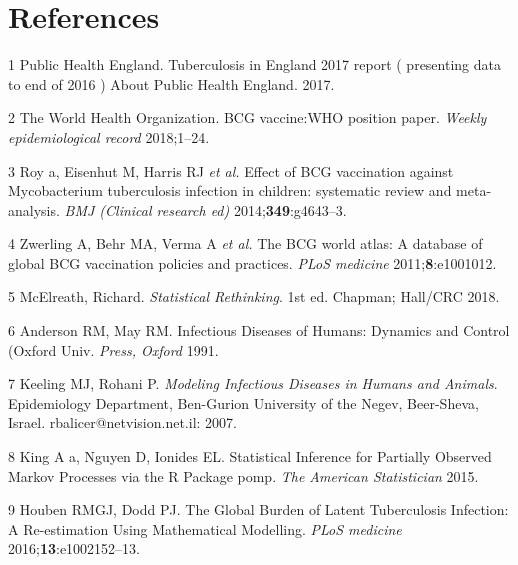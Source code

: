 \documentclass[11pt,twoside]{bristolthesis}
\begin{document}
  \backmatter
  
  \hypertarget{references}{%
  \chapter{References}\label{references}}
  
  \noindent
  
  \setlength{\parindent}{-0.20in}
  \setlength{\leftskip}{0.20in}
  \setlength{\parskip}{8pt}
  
  \hypertarget{refs}{}
  \leavevmode\hypertarget{ref-PHE2017}{}%
  1 Public Health England. Tuberculosis in England 2017 report ( presenting data to end of 2016 ) About Public Health England. 2017.
  
  \leavevmode\hypertarget{ref-TheWorldHealthOrganization:2018va}{}%
  2 The World Health Organization. BCG vaccine:WHO position paper. \emph{Weekly epidemiological record} 2018;1--24.
  
  \leavevmode\hypertarget{ref-Roy2014}{}%
  3 Roy a, Eisenhut M, Harris RJ \emph{et al.} Effect of BCG vaccination against Mycobacterium tuberculosis infection in children: systematic review and meta-analysis. \emph{BMJ (Clinical research ed)} 2014;\textbf{349}:g4643--3.
  
  \leavevmode\hypertarget{ref-Zwerling2011a}{}%
  4 Zwerling A, Behr MA, Verma A \emph{et al.} The BCG world atlas: A database of global BCG vaccination policies and practices. \emph{PLoS medicine} 2011;\textbf{8}:e1001012.
  
  \leavevmode\hypertarget{ref-McElreath:2018j}{}%
  5 McElreath, Richard. \emph{Statistical Rethinking}. 1st ed. Chapman; Hall/CRC 2018.
  
  \leavevmode\hypertarget{ref-Anderson1991}{}%
  6 Anderson RM, May RM. Infectious Diseases of Humans: Dynamics and Control (Oxford Univ. \emph{Press, Oxford} 1991.
  
  \leavevmode\hypertarget{ref-Keeling2007}{}%
  7 Keeling MJ, Rohani P. \emph{Modeling Infectious Diseases in Humans and Animals}. Epidemiology Department, Ben-Gurion University of the Negev, Beer-Sheva, Israel. rbalicer@netvision.net.il: 2007.
  
  \leavevmode\hypertarget{ref-King}{}%
  8 King A a, Nguyen D, Ionides EL. Statistical Inference for Partially Observed Markov Processes via the R Package pomp. \emph{The American Statistician} 2015.
  
  \leavevmode\hypertarget{ref-Houben:2016jp}{}%
  9 Houben RMGJ, Dodd PJ. The Global Burden of Latent Tuberculosis Infection: A Re-estimation Using Mathematical Modelling. \emph{PLoS medicine} 2016;\textbf{13}:e1002152--13.
  
\end{document}
